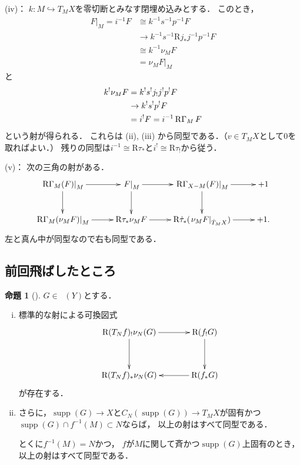 \documentclass[uplatex,dvipdfmx,a4paper,10pt,draft]{jsarticle}
\makeatletter
\theoremstyle{definition}
\renewenvironment{proof}[1][\proofname]{\par
  \pushQED{\qed}%
  \normalfont \topsep6\p@\@plus6\p@\relax
  \trivlist
  \item[\hskip\labelsep
         \bfseries
    {#1}]\ignorespaces
}{%
  \popQED\endtrivlist\@endpefalse
}
\renewcommand{\proofname}{証明.}
\numberwithin{equation}{section}
\newcommand{\supp}{\mathop{\mathrm{supp}}\nolimits}
\newcommand{\Dompb}{\mathop{\mathsf{D}^\mathrm{b}}\nolimits}
\newcommand{\RG}{\mathop{\mathrm{R}\hspace{-0pt}\Gamma}\nolimits}
\newcommand{\Rder}{\mathrm{R}}
\newcommand{\mres}[2][]{{\left.{#1}\right\rvert}_{#2}}
\theoremstyle{mystyle}
\newtheorem{myprp}[mythm]{命題}
\newenvironment{prp}{\begin{prpbox}\begin{myprp}}{\end{myprp}\end{prpbox}}
\makeatother
\begin{document}
\begin{proof}
    (iv)：
    \(k\colon M\hookrightarrow T_{M}X\)を零切断とみなす閉埋め込みとする．
    このとき，\begin{align*}
        \mres[F]{M}
        =i^{-1}F
        &\cong k^{-1}s^{-1}p^{-1}F\\
        &\to k^{-1}s^{-1}\Rder{j}_{\ast}j^{-1}p^{-1}F\\
        &\cong k^{-1}\nu_{M}F\\
        &=\mres[\nu_{M}F]{M}
    \end{align*}
    と\begin{align*}
        k^{!}\nu_{M}F
        &= k^{!}s^{!}j_{!}j^{!}p^{!}F\\
        &\to k^{!}s^{!}p^{!}F\\
        &= i^{!}F=i^{-1}\RG_{M}F
    \end{align*}
    という射が得られる．
    これらは (ii), (iii) から同型である．（\(v\in T_{M}X\)として\(0\)を取ればよい．）
    残りの同型は\(i^{-1}\cong \Rder{\tau}_{\ast}\)と\(i^{!}\cong \Rder{\tau}_{!}\)から従う．

    (v)：
    次の三角の射がある．
    \[    
        \vcenter{\xymatrix@C=26pt@R=26pt{
        \mres[\RG_{M}(F)]{M}    
        \ar[d]
        \ar[r]
        &
        \mres[F]{M}    
        \ar[r]
        \ar[d]
        &
        \mres[\RG_{X-M}(F)]{M}    
        \ar[r]
        \ar[d]
        &
        +1
        \\
        \mres[\RG_{M}(\nu_{M}F)]{M}    
        \ar[r]
        &
        \Rder{\tau_{\ast}}\nu_{M}F    
        \ar[r]
        &
        \Rder{\dot{\tau}}_{\ast}(\mres[\nu_{M}F]{\dot{T}_{M}X})    
        \ar[r]
        &
        +1.
      }}
    \]
    左と真ん中が同型なので右も同型である．
\end{proof}

\subsection*{前回飛ばしたところ}
\begin{prp}[{\cite[Prop.4.2.4]{KS90}}]
    \(G\in\Dompb(Y)\)とする．
    \begin{enumerate}[(i)]
        \item 標準的な射による可換図式    \[    
            \vcenter{\xymatrix@C=36pt@R=36pt{
            \Rder(T_{N}f)_{!}\nu_{N}(G)
            \ar[d]
            \ar[r]
            &
            \Rder({f_{!}}G)
            \ar[d]
            \\
            \Rder(T_{N}f)_{\ast}\nu_{N}(G)
            &
            \Rder({f_{\ast}}G)
            \ar[l]
          }}
        \]が存在する．
        \item さらに，\(\supp(G)\to X\)と\(
            C_N(\supp(G))\to T_{M}X
        \)が固有かつ\(\supp(G)\cap f^{-1}(M)\subset N\)ならば，
        以上の射はすべて同型である．
        
        とくに\(f^{-1}(M)=N\)かつ，
        \(f\)が\(M\)に関して斉かつ\(\supp(G)\)上固有のとき，
        以上の射はすべて同型である．
    \end{enumerate}
\end{prp}
\end{document}
